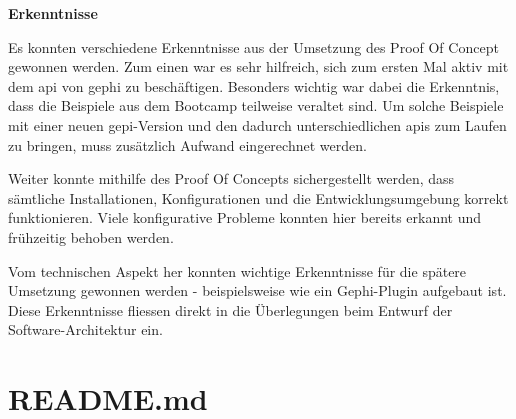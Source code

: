 \textbf{Erkenntnisse}

Es konnten verschiedene Erkenntnisse aus der Umsetzung des Proof Of Concept gewonnen werden.
Zum einen war es sehr hilfreich, sich zum ersten Mal aktiv mit dem \acs{api} von \acs{gephi} zu beschäftigen. Besonders wichtig war
dabei die Erkenntnis, dass die Beispiele aus dem Bootcamp teilweise veraltet sind. Um solche Beispiele mit einer neuen \acs{gepi}-Version
und den dadurch unterschiedlichen \acs{api}s zum Laufen zu bringen, muss zusätzlich Aufwand eingerechnet werden.

Weiter konnte mithilfe des Proof Of Concepts sichergestellt werden, dass sämtliche Installationen, Konfigurationen und die
Entwicklungsumgebung korrekt funktionieren. Viele konfigurative Probleme konnten hier bereits erkannt und frühzeitig behoben werden.

Vom technischen Aspekt her konnten wichtige Erkenntnisse für die spätere Umsetzung gewonnen werden - beispielsweise
wie ein Gephi-Plugin aufgebaut ist. Diese Erkenntnisse fliessen direkt in die Überlegungen beim Entwurf der Software-Architektur ein.

\section{README.md}
\label{readme}

